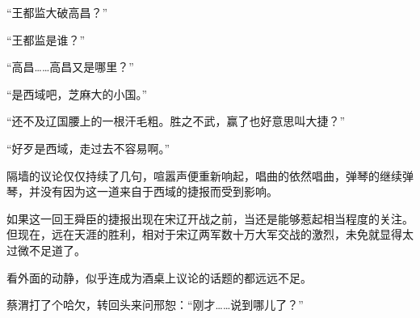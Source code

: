 “王都监大破高昌？”

“王都监是谁？”

“高昌……高昌又是哪里？”

“是西域吧，芝麻大的小国。”

“还不及辽国腰上的一根汗毛粗。胜之不武，赢了也好意思叫大捷？”

“好歹是西域，走过去不容易啊。”

隔墙的议论仅仅持续了几句，喧嚣声便重新响起，唱曲的依然唱曲，弹琴的继续弹琴，并没有因为这一道来自于西域的捷报而受到影响。

如果这一回王舜臣的捷报出现在宋辽开战之前，当还是能够惹起相当程度的关注。但现在，远在天涯的胜利，相对于宋辽两军数十万大军交战的激烈，未免就显得太过微不足道了。

看外面的动静，似乎连成为酒桌上议论的话题的都远远不足。

蔡渭打了个哈欠，转回头来问邢恕：“刚才……说到哪儿了？”

